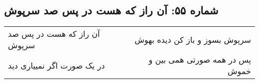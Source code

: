 \begin{center}
\section*{شماره ۵۵: آن راز که هست در پس صد سرپوش}
\label{sec:055}
\begin{longtable}{l p{0.5cm} r}
آن راز که هست در پس صد سرپوش
&&
سرپوش بسوز و باز کن دیده بهوش
\\
در یک صورت اگر نمییاری دید
&&
پس در همه صورتی همی بین و خموش
\\
\end{longtable}
\end{center}
